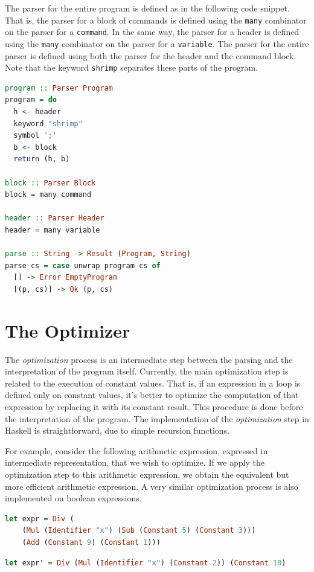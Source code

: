\documentclass[12pt,a4paper]{article}
\begin{document}
The parser for the entire program is defined as in the following code snippet.
That is, the parser for a block of commands is defined using the \texttt{many} combinator on the parser for a \texttt{command}.
In the same way, the parser for a header is defined using the \texttt{many} combinator on the parser for a \texttt{variable}.
The parser for the entire parser is defined using both the parser for the header and the command block.
Note that the keyword \texttt{shrimp} separates these parts of the program.
\begin{lstlisting}[language=Haskell, style=custom-style]
program :: Parser Program
program = do
  h <- header
  keyword "shrimp"
  symbol ';'
  b <- block
  return (h, b)

block :: Parser Block
block = many command

header :: Parser Header
header = many variable

parse :: String -> Result (Program, String)
parse cs = case unwrap program cs of
  [] -> Error EmptyProgram
  [(p, cs)] -> Ok (p, cs)
\end{lstlisting}

\clearpage

\section*{The Optimizer}
The \textit{optimization} process is an intermediate step between the parsing and the interpretation of the program itself.
Currently, the main optimization step is related to the execution of constant values.
That is, if an expression in a loop is defined only on constant values, it's better to optimize the computation of that expression by replacing it with its constant result.
This procedure is done before the interpretation of the program.
The implementation of the \textit{optimization} step in Haskell is straightforward, due to simple recursion functions.

For example, consider the following arithmetic expression, expressed in intermediate representation, that we wish to optimize.
If we apply the optimization step to this arithmetic expression, we obtain the equivalent but more efficient arithmetic expression.
A very similar optimization process is also implemented on boolean expressions.
\begin{lstlisting}[language=Haskell, style=custom-style]
let expr = Div (
    (Mul (Identifier "x") (Sub (Constant 5) (Constant 3)))
    (Add (Constant 9) (Constant 1)))
\end{lstlisting}
\begin{lstlisting}[language=Haskell, style=custom-style]
let expr' = Div (Mul (Identifier "x") (Constant 2)) (Constant 10)
\end{lstlisting}
\end{document}
